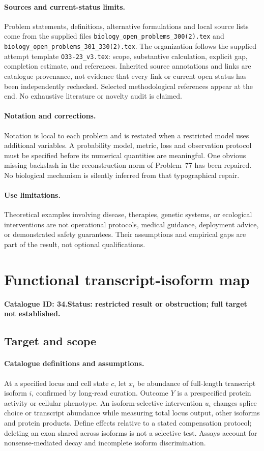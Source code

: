 \documentclass[11pt]{article}
\begin{document}
\paragraph{Sources and current-status limits.}
Problem statements, definitions, alternative formulations and local source lists
come from the supplied files
\texttt{biology\_open\_problems\_300(2).tex} and
\texttt{biology\_open\_problems\_301\_330(2).tex}.
The organization follows the supplied attempt template
\texttt{O33-23\_v3.tex}: scope, substantive calculation, explicit gap,
completion estimate, and references. Inherited source annotations and links are
catalogue provenance, not evidence that every link or current open status has
been independently rechecked. Selected methodological references appear at the
end. No exhaustive literature or novelty audit is claimed.

\paragraph{Notation and corrections.}
Notation is local to each problem and is restated when a restricted model uses
additional variables. A probability model, metric, loss and observation protocol
must be specified before its numerical quantities are meaningful. One obvious
missing backslash in the reconstruction norm of Problem~77 has been repaired.
No biological mechanism is silently inferred from that typographical repair.

\paragraph{Use limitations.}
Theoretical examples involving disease, therapies, genetic systems, or ecological
interventions are not operational protocols, medical guidance, deployment advice,
or demonstrated safety guarantees. Their assumptions and empirical gaps are part
of the result, not optional qualifications.

\setcounter{section}{33}
\section{Functional transcript-isoform map}
\label{prob:034}
\noindent\textbf{Catalogue ID: 34.}\quad \textbf{Status: restricted result or obstruction; full target not established.}
\subsection{Target and scope}
\paragraph{Catalogue definitions and assumptions.}
At a specified locus and cell state $c$, let $x_i$ be abundance of full-length transcript isoform $i$, confirmed by long-read curation. Outcome $Y$ is a prespecified protein activity or cellular phenotype. An isoform-selective intervention $u_i$ changes splice choice or transcript abundance while measuring total locus output, other isoforms and protein products. Define effects relative to a stated compensation protocol; deleting an exon shared across isoforms is not a selective test. Assays account for nonsense-mediated decay and incomplete isoform discrimination.
\end{document}
